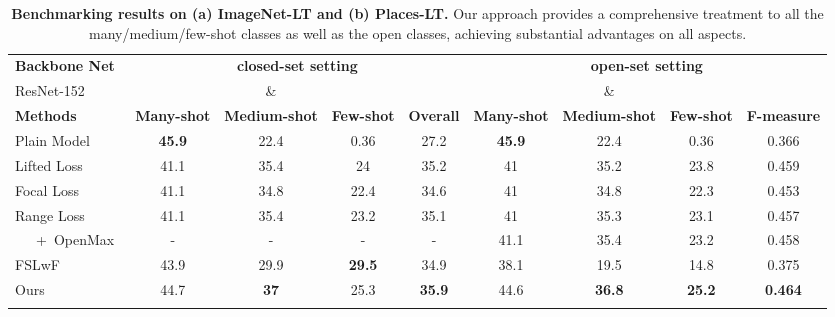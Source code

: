 \documentclass[10pt,twocolumn,letterpaper]{article}
\begin{document}
\begin{table*}
\begin{subtable}{\linewidth}
\centering
\bgroup
\begin{tabular}{l|cccc|cccc}
\Xhline{1pt}
\textbf{Backbone Net} & \multicolumn{4}{c|}{\footnotesize{\textbf{closed-set setting}}} & \multicolumn{4}{c}{\footnotesize{\textbf{open-set setting}}} \\
ResNet-152 &  &  \&  &  &&  &  \&  &  &\\
\textbf{Methods} & \textbf{Many-shot} & \textbf{Medium-shot} & \textbf{Few-shot} & \textbf{Overall} & \textbf{Many-shot} & \textbf{Medium-shot} & \textbf{Few-shot} & \textbf{F-measure} \\
\hline\hline
Plain Model~\cite{he2016deep} & \textbf{45.9} & 22.4 & 0.36 & 27.2 & \textbf{45.9} & 22.4 & 0.36 & 0.366 \\
Lifted Loss~\cite{oh2016deep} & 41.1 & 35.4 & 24 & 35.2 & 41 & 35.2 & 23.8 & 0.459 \\
Focal Loss~\cite{lin2017focal} & 41.1 & 34.8 & 22.4 & 34.6 & 41 & 34.8 & 22.3 & 0.453 \\
Range Loss~\cite{zhang2017range} & 41.1 & 35.4 & 23.2 & 35.1 & 41 & 35.3 & 23.1 & 0.457 \\
~~~+~OpenMax~\cite{bendale2016towards} & - & - & - & - & 41.1 & 35.4 & 23.2 & 0.458 \\
FSLwF~\cite{gidaris2018dynamic} & 43.9 & 29.9 & \textbf{29.5} & 34.9 & 38.1 & 19.5 & 14.8 & 0.375 \\
\hline
Ours & 44.7 & \textbf{37} & 25.3 & \textbf{35.9} & 44.6 & \textbf{36.8} & \textbf{25.2} & \textbf{0.464} \\
\Xhline{1pt}
\end{tabular}\vspace{-5pt}
\egroup
{}
\end{subtable}
\caption{\textbf{Benchmarking results on (a) ImageNet-LT and (b) Places-LT.} Our approach provides a comprehensive treatment to all the many/medium/few-shot classes as well as the open classes, achieving substantial advantages on all aspects.}
\label{tab:benchmark_imagenet}
\end{table*}
\end{document}
